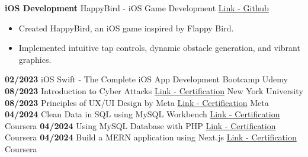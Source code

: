 \documentclass[9pt]{developercv} %
\begin{document}
\begin{entrylist}
{\begin{itemize}[noitemsep,topsep=0pt,parsep=0pt,partopsep=0pt,leftmargin=-1pt]
        \end{itemize}}
    \entry
        {\textbf{iOS Development}}
        {HappyBird - iOS Game Development}
        {\href{https://github.com/Iamyashsiwach/HappyBird}{Link - Github}}
        {\vspace{-\topsep} %
        \begin{itemize}[noitemsep,topsep=0pt,parsep=0pt,partopsep=0pt,leftmargin=-1pt]
            \item Created HappyBird, an iOS game inspired by Flappy Bird.
            \item Implemented intuitive tap controls, dynamic obstacle generation, and vibrant graphics.
        \end{itemize}}
\end{entrylist}


\vspace{-20pt}
\begin{entrylist}\vspace{-6pt}
    \entry 
       {\textbf{02/2023}}
        {iOS Swift - The Complete iOS App Development Bootcamp}
        {}
        {Udemy}
        \vspace{-6pt}
    \entry
       {\textbf{08/2023}}
        {Introduction to Cyber Attacks}
        {\href{https://coursera.org/verify/8W8PWE46S26X}{Link - Certification}}
        {New York University}
        \vspace{-6pt}
    \entry
       {\textbf{08/2023}}
        {Principles of UX/UI Design by Meta}
        {\href{https://coursera.org/verify/WCEKDRQCCW4B}{Link - Certification}}
        {Meta}
    \entry
       {\textbf{04/2024}}
        {Clean Data in SQL using MySQL Workbench}
        {\href{https://coursera.org/verify/XGVP9YAUKMXT}{Link - Certification}}
        {Coursera}
        \vspace{-6pt}
    \entry
       {\textbf{04/2024}}
        {Using MySQL Database with PHP}
        {\href{https://coursera.org/verify/XMQ936YYLDE3}{Link - Certification}}
        {Coursera}
        \vspace{-6pt}
    \entry
       {\textbf{04/2024}}
        {Build a MERN application using Next.js}
        {\href{https://coursera.org/verify/HQUKBXN7T99S}{Link - Certification}}
        {Coursera}
\end{entrylist}


\end{document}
